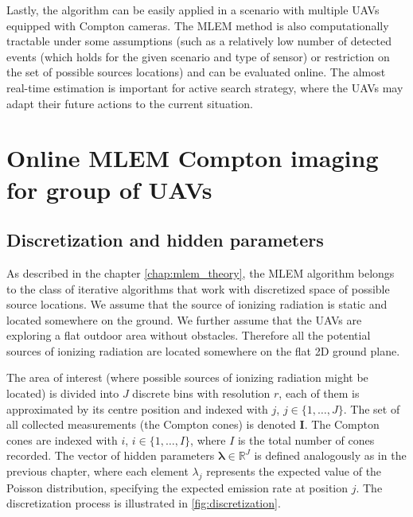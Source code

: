 Lastly, the algorithm can be easily applied in a scenario with multiple \ac{UAV}s equipped with Compton cameras.
The \ac{MLEM} method is also computationally tractable under some assumptions 
(such as a relatively low number of detected events (which holds for the given scenario and type of sensor) or restriction on the set of possible sources locations)
and can be evaluated online.
The almost real-time estimation is important for active search strategy, where the \ac{UAV}s may adapt their future actions to the current situation.

\section{Online MLEM Compton imaging for group of \ac{UAV}s}
\label{sec:setup}
\subsection{Discretization and hidden parameters}
As described in the chapter \autoref{chap:mlem_theory}, the \ac{MLEM} algorithm belongs to the class of iterative algorithms that work with discretized space of possible source locations.
We assume that the source of ionizing radiation is static and located somewhere on the ground.
We further assume that the \ac{UAV}s are exploring a flat outdoor area without obstacles. Therefore all the potential sources of ionizing radiation are located somewhere on the flat 2D ground plane.

The area of interest (where possible sources of ionizing radiation might be located) is divided into $J$ discrete bins with resolution $r$, each of them is approximated by its centre position and indexed with $j$, $j \in \{1, \dots , J\}$.
The set of all collected measurements (the Compton cones) is denoted $\mathbf{I}$.
The Compton cones are indexed with $i$, $i \in \{1, \dots, I\}$, where $I$ is the total number of cones recorded.
The vector of hidden parameters $\bm{\lambda}\in \mathbb{R}^{J}$ is defined analogously as in the previous chapter, where each element $\lambda_{j}$ represents the expected value of the Poisson distribution, specifying the expected emission rate at position $j$.
The discretization process is illustrated in  \autoref{fig:discretization}.

